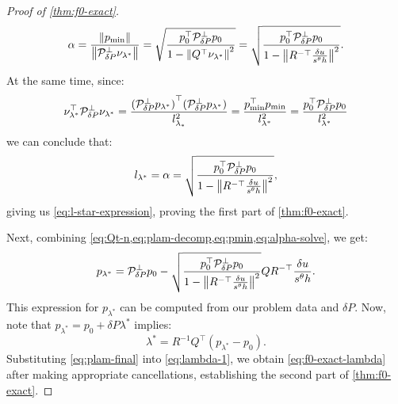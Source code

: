\documentclass[sisc-eikonal.tex]{subfiles}
\begin{document}
\begin{proof}[Proof of \cref{thm:f0-exact}]
  \begin{equation}\label{eq:alpha-solve}
    \alpha = \frac{\norm{\pmin}}{\norm{\mathcal{P}^\perp_{\delta P} \nu_{\lambda^*}}} = \sqrt{\frac{p_0^\top \mathcal{P}^\perp_{\delta P} p_0}{1 - \norm{Q^\top \nu_{\lambda^*}}^2}} = \sqrt{\frac{p_0^\top \mathcal{P}^\perp_{\delta P} p_0}{1 - \norm{R^{-\top} \frac{\delta u}{s^\theta h}}^2}}.
  \end{equation}
  At the same time, since:
  \begin{equation}
    \nu_{\lambda^*}^\top \mathcal{P}^\perp_{\delta P} \nu_{\lambda^*} = \frac{{(\mathcal{P}^\perp_{\delta P} p_{\lambda^*})}^\top {(\mathcal{P}^\perp_{\delta P} p_{\lambda^*})}}{l_{\lambda_*}^2} = \frac{p_{\operatorname{min}}^\top p_{\operatorname{min}}}{l_{\lambda^*}^2} = \frac{p_0^\top \mathcal{P}^\perp_{\delta P} p_0}{l_{\lambda^*}^2}
  \end{equation}
  we can conclude that:
  \begin{equation}
    l_{\lambda^*} = \alpha = \sqrt{\frac{p_0^\top \mathcal{P}^\perp_{\delta P} p_0}{1 - \left\|R^{-\top} \frac{\delta u}{s^\theta h}\right\|^2}},
  \end{equation}
  giving us \cref{eq:l-star-expression}, proving the first part of
  \cref{thm:f0-exact}.

  Next, combining
  \cref{eq:Qt-n,eq:plam-decomp,eq:pmin,eq:alpha-solve}, we get:
  \begin{equation}\label{eq:plam-final}
    p_{\lambda^*} = \mathcal{P}^\perp_{\delta P} p_0 - \sqrt{\frac{p_0^\top \mathcal{P}^\perp_{\delta P} p_0}{1 - \norm{R^{-\top} \frac{\delta u}{s^\theta h}}^2}} Q R^{-\top} \frac{\delta u}{s^\theta h}.
  \end{equation}
  This expression for $p_{\lambda^*}$ can be computed from our problem
  data and $\delta P$. Now, note that
  $p_{\lambda^*} = p_0 + \delta P \lambda^*$ implies:
  \begin{equation}\label{eq:lambda-1}
    \lambda^* = R^{-1} Q^\top (p_{\lambda^*} - p_0).
  \end{equation}
  Substituting \cref{eq:plam-final} into \cref{eq:lambda-1}, we obtain
  \cref{eq:f0-exact-lambda} after making appropriate cancellations,
  establishing the second part of \cref{thm:f0-exact}.


\end{proof}
\end{document}
